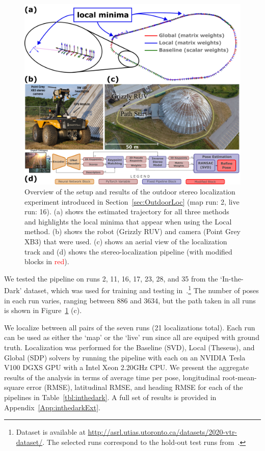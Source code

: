 \documentclass[lettersize,journal]{IEEEtran}
\begin{document}
\begin{figure}[]
	\centering
	\includegraphics[width=\columnwidth]{figs/in-the-dark-traj.png}
	\caption{Overview of the setup and results of the outdoor stereo localization experiment introduced in Section~\ref{sec:OutdoorLoc} (map run: 2, live run: 16). (a) shows the estimated trajectory for all three methods and highlights the local minima that appear when using the Local method. (b) shows the robot (Grizzly RUV) and camera (Point Grey XB3) that were used. (c) shows an aerial view of the localization track and (d) shows the stereo-localization pipeline (with modified blocks in \textcolor{red}{red}).}
	\label{fig:inthedark}
\end{figure}

We tested the pipeline on runs 2, 11, 16, 17, 23, 28, and 35 from the `In-the-Dark' dataset, which was used for training and testing in~\cite{gridsethKeepingEyeThings2022}.\footnote{Dataset is available at \url{http://asrl.utias.utoronto.ca/datasets/2020-vtr-dataset/}. The selected runs correspond to the hold-out test runs from~\cite{gridsethKeepingEyeThings2022}.} The number of poses in each run varies, ranging between 886 and 3634, but the path taken in all runs is shown in Figure~\ref{fig:inthedark} (c). 

We localize between all pairs of the seven runs (21 localizations total). Each run can be used as either the `map' or the `live' run since all are equiped with ground truth. Localization was performed for the Baseline (SVD), Local (Theseus), and Global (SDP) solvers by running the pipeline with each on an NVIDIA Tesla V100 DGXS GPU with a Intel Xeon 2.20GHz CPU. We present the aggregate results of the analysis in terms of average time per pose, longitudinal root-mean-square error (RMSE), latitudinal RMSE, and heading RMSE for each of the pipelines in Table~\ref{tbl:inthedark}. A full set of results is provided in Appendix~\ref{App:inthedarkExt}.
\end{document}
